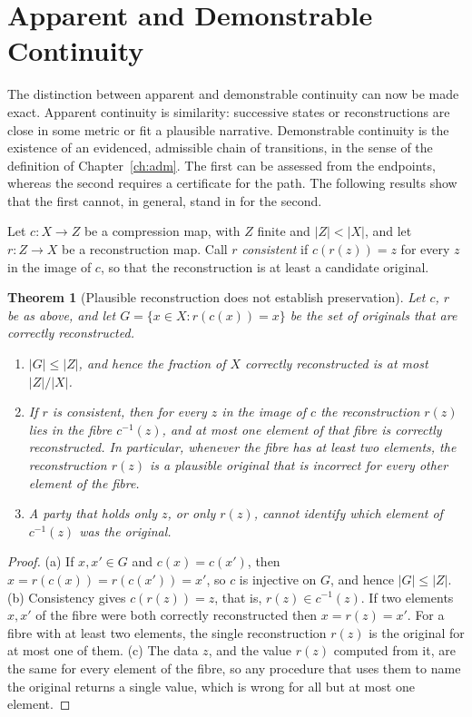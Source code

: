 \documentclass[11pt,twoside,openright]{book}
\theoremstyle{plain}
\newtheorem{theorem}{Theorem}[chapter]
\theoremstyle{definition}
\theoremstyle{remark}
\begin{document}
\section{Apparent and Demonstrable Continuity}

The distinction between apparent and demonstrable continuity can now be made exact. Apparent continuity is similarity: successive states or reconstructions are close in some metric or fit a plausible narrative. Demonstrable continuity is the existence of an evidenced, admissible chain of transitions, in the sense of the definition of Chapter~\ref{ch:adm}. The first can be assessed from the endpoints, whereas the second requires a certificate for the path. The following results show that the first cannot, in general, stand in for the second.

Let $c:X\to Z$ be a compression map, with $Z$ finite and $|Z|<|X|$, and let $r:Z\to X$ be a reconstruction map. Call $r$ \emph{consistent} if $c(r(z))=z$ for every $z$ in the image of $c$, so that the reconstruction is at least a candidate original.

\begin{theorem}[Plausible reconstruction does not establish preservation]\label{thm:reconstruction}
Let $c$, $r$ be as above, and let $G=\{x\in X: r(c(x))=x\}$ be the set of originals that are correctly reconstructed.
\begin{enumerate}
\item[(a)] $|G|\le|Z|$, and hence the fraction of $X$ correctly reconstructed is at most $|Z|/|X|$.
\item[(b)] If $r$ is consistent, then for every $z$ in the image of $c$ the reconstruction $r(z)$ lies in the fibre $c^{-1}(z)$, and at most one element of that fibre is correctly reconstructed. In particular, whenever the fibre has at least two elements, the reconstruction $r(z)$ is a plausible original that is incorrect for every other element of the fibre.
\item[(c)] A party that holds only $z$, or only $r(z)$, cannot identify which element of $c^{-1}(z)$ was the original.
\end{enumerate}
\end{theorem}

\begin{proof}
(a) If $x,x'\in G$ and $c(x)=c(x')$, then $x=r(c(x))=r(c(x'))=x'$, so $c$ is injective on $G$, and hence $|G|\le|Z|$. (b) Consistency gives $c(r(z))=z$, that is, $r(z)\in c^{-1}(z)$. If two elements $x,x'$ of the fibre were both correctly reconstructed then $x=r(z)=x'$. For a fibre with at least two elements, the single reconstruction $r(z)$ is the original for at most one of them. (c) The data $z$, and the value $r(z)$ computed from it, are the same for every element of the fibre, so any procedure that uses them to name the original returns a single value, which is wrong for all but at most one element.
\end{proof}
\end{document}
